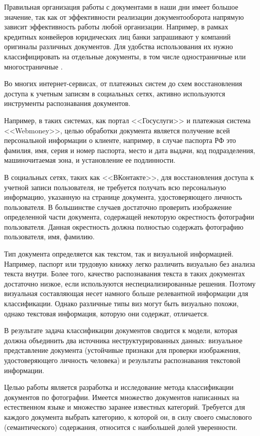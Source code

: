 \Introduction

Правильная организация работы с документами в наши дни имеет большое значение, так как от эффективности реализации документооборота напрямую зависит эффективность работы любой организации. Например, в рамках кредитных конвейеров юридических лиц банки запрашивают у компаний оригиналы различных документов. Для удобства использования их нужно классифицировать на отдельные документы, в том числе одностраничные или многостраничные \cite{bank}.

Во многих интернет-сервисах, от платежных систем до схем восстановления доступа к учетным записям в социальных сетях, активно используются инструменты распознавания документов. 

Например, в таких системах, как портал <<Госуслуги>>\cite{gosuslugi} и платежная система <<Webmoney>>\cite{webmoney}, целью обработки документа является получение всей персональной информации о клиенте, например, в случае паспорта РФ это фамилия, имя, серия и номер паспорта, место и дата выдачи, код подразделения, машиночитаемая зона, и установление ее подлинности. 

В социальных сетях, таких как <<ВКонтакте>>\cite{vk}, для восстановления доступа к учетной записи пользователя, не требуется получать всю персональную информацию, указанную на странице документа, удостоверяющего личность пользователя. В большинстве случаев достаточно проверить изображение определенной части документа, содержащей некоторую окрестность фотографии пользователя. Данная окрестность должна полностью содержать фотографию пользователя, имя, фамилию. 

Тип документа определяется как текстом, так и визуальной информацией. Например, паспорт или трудовую книжку легко различить визуально без анализа текста внутри. Более того, качество распознавания текста в таких документах достаточно низкое, если используются неспециализированные решения. Поэтому визуальная составляющая несет намного больше релевантной информации для классификации. Однако различные типы виз могут быть визуально похожи, однако текстовая информация, которую они содержат, отличается. 

В результате задача классификации документов сводится к модели, которая должна объединить два источника неструктурированных данных: визуальное представление документа (устойчивые признаки для проверки изображения, удостоверяющего личность человека) и результаты распознавания текстовой информации.

Целью работы является разработка и исследование метода классификации документов по фотографии. Имеется множество документов написанных на естественном языке и множество заранее известных категорий. Требуется для каждого документа выбрать категорию, к которой он, в силу своего смыслового (семантического) содержания, относится с наибольшей долей уверенности.


